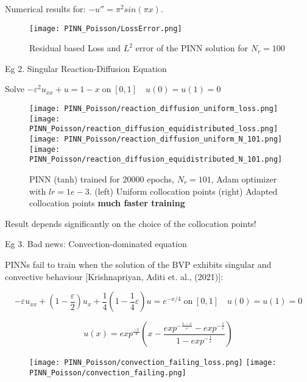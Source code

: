 \documentclass{beamer}
\begin{document}
\begin{frame}{Numerical results for:  $-u'' = \pi^2 sin(\pi x)$.}

\begin{figure}
   \centering
   \texttt{[image: PINN\_Poisson/LossError.png]}
    \caption{Residual based Loss and $L^{2}$ error of the PINN solution for $N_{r} = 100$}
    \label{fig:PINN_loss_err}
\end{figure}


\end{frame}





\begin{frame}{Eg 2. Singular Reaction-Diffusion Equation}

Solve $-\varepsilon^{2}u_{xx} + u = 1- x \; \text{on} \; [0,1] \quad  u(0) = u(1) = 0$\\

\vspace{2mm}


\begin{figure}
    \centering
    \texttt{[image: PINN\_Poisson/reaction\_diffusion\_uniform\_loss.png]}
    \texttt{[image: PINN\_Poisson/reaction\_diffusion\_equidistributed\_loss.png]}\\
    \texttt{[image: PINN\_Poisson/reaction\_diffusion\_uniform\_N\_101.png]}
    \texttt{[image: PINN\_Poisson/reaction\_diffusion\_equidistributed\_N\_101.png]}
     \caption{PINN (tanh) trained for 20000 epochs, $N_{r} = 101$, Adam optimizer with $lr = 1e-3$. (left) Uniform collocation points (right) Adapted collocation points {\bf much faster training}}
    \label{fig:reaction_diffusion  }
\end{figure}

 Result depends significantly on the choice of the collocation points!
\end{frame}


\begin{frame}{Eg 3. Bad news: Convection-dominated equation}

{\color{red} PINNs fail to train} when the solution of the BVP exhibits singular and convective behaviour [Krishnapriyan, Aditi et. al., (2021)]:

$$-\varepsilon u_{xx} + \left(1-\frac{\varepsilon}{2}\right)u_{x} + \frac{1}{4}\left(1-\frac{1}{4}\varepsilon\right)u =  e^{-x/4} \; \text{on} \; [0,1] \quad  u(0) = u(1) = 0$$

$$u(x) = exp^{\frac{-x}{4}}\left( x - \frac{exp^{-\frac{1-x}{\varepsilon}} - exp^{-\frac{1}{\varepsilon}}}{1 - exp^{-\frac{1}{\varepsilon}}}\right) $$


\begin{figure}
    \centering
    \texttt{[image: PINN\_Poisson/convection\_failing\_loss.png]}
     \texttt{[image: PINN\_Poisson/convection\_failing.png]}
    \label{fig:convection_loss}
\end{figure}



\end{frame}
\end{document}
